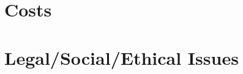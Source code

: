 \documentclass[11pt]{article}
\begin{document}
\section{Costs}

\section{Legal/Social/Ethical Issues}

\printbibliography[heading=bibintoc]

\end{document}
